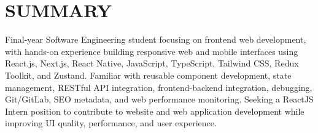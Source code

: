 \section{SUMMARY}
\noindent Final-year Software Engineering student focusing on frontend web development, with hands-on experience building responsive web and mobile interfaces using React.js, Next.js, React Native, JavaScript, TypeScript, Tailwind CSS, Redux Toolkit, and Zustand. Familiar with reusable component development, state management, RESTful API integration, frontend-backend integration, debugging, Git/GitLab, SEO metadata, and web performance monitoring. Seeking a ReactJS Intern position to contribute to website and web application development while improving UI quality, performance, and user experience.
